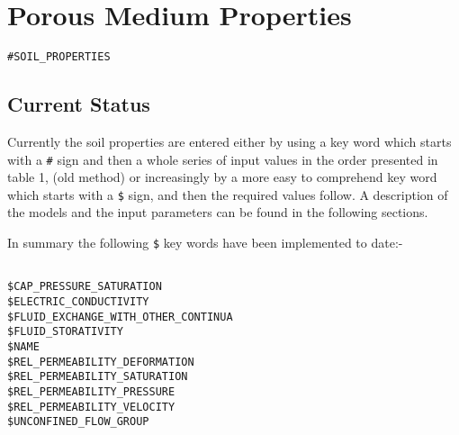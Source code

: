 
\normalsize
\section{Porous Medium Properties}

\begin{verbatim}
#SOIL_PROPERTIES
\end{verbatim}

\subsection{Current Status}

Currently the soil properties are entered either by using a key
word which starts with a \verb+#+ sign and then a whole series of
input values in the order presented in table 1, (old method) or
increasingly by a more easy to comprehend key word which starts
with a \verb+$+ sign, and then the required values follow. A
description of the models and the input parameters can be found in
the following sections.

\vspace{0.5cm}

In summary the following \verb+$+ key words have been implemented
to date:-

\begin{verbatim}

$CAP_PRESSURE_SATURATION
$ELECTRIC_CONDUCTIVITY
$FLUID_EXCHANGE_WITH_OTHER_CONTINUA
$FLUID_STORATIVITY
$NAME
$REL_PERMEABILITY_DEFORMATION
$REL_PERMEABILITY_SATURATION
$REL_PERMEABILITY_PRESSURE
$REL_PERMEABILITY_VELOCITY
$UNCONFINED_FLOW_GROUP

\end{verbatim}





